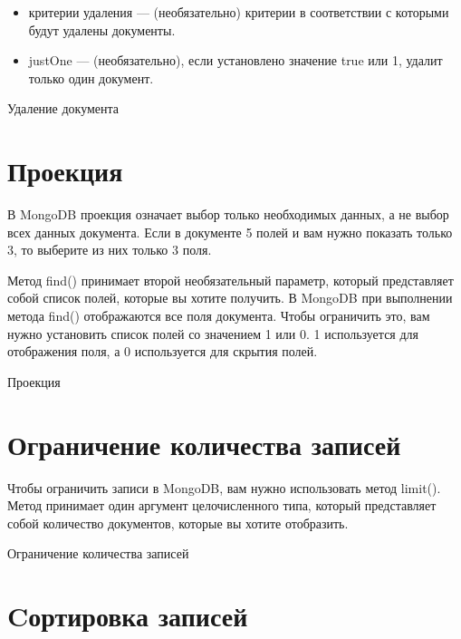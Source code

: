 \begin{itemize}
	\item критерии удаления — (необязательно) критерии в соответствии с
		которыми будут удалены документы.
	\item justOne — (необязательно), если установлено значение true или 1,
		удалит только один документ.
\end{itemize}

\begin{image}
	\caption{Удаление документа}
	\label{fig:remove}
\end{image}

\clearpage
\section{Проекция}

В MongoDB проекция означает выбор только необходимых данных, а не
выбор всех данных документа. Если в документе 5 полей и вам нужно показать
только 3, то выберите из них только 3 поля.\par
Метод find() принимает второй необязательный параметр, который
представляет собой список полей, которые вы хотите получить. В MongoDB при
выполнении метода find() отображаются все поля документа. Чтобы ограничить 
это, вам нужно установить список полей со значением 1 или 0. 1 используется
для отображения поля, а 0 используется для скрытия полей.

\begin{image}
	\caption{Проекция}
	\label{fig:select}
\end{image}

\clearpage
\section{Ограничение количества записей}

Чтобы ограничить записи в MongoDB, вам нужно использовать метод
limit(). Метод принимает один аргумент целочисленного типа, который
представляет собой количество документов, которые вы хотите отобразить.

\begin{image}
	\caption{Ограничение количества записей}
	\label{fig:limit}
\end{image}

\clearpage
\section{Cортировка записей}

